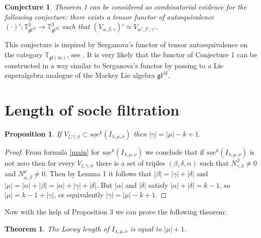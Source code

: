 \documentclass[letterpaper,11pt]{article}
\newtheorem{theorem}{Theorem}
\newtheorem{conjecture}{Conjecture}
\newtheorem{proposition}{Proposition}
\begin{document}
	\begin{conjecture}
		Theorem 1 can be considered as combinatorial evidence for the following conjecture: there exists a tensor functor of autoequivalence $(\cdot)':\mathbb{T}^3_{\mathfrak{gl}^M} \rightarrow \mathbb{T}^3_{\mathfrak{gl}^M}$ such that $(V_{\alpha, \beta, \gamma})' \simeq V_{\alpha', \beta', \gamma'}$.
	\end{conjecture}
	This conjecture is inspired by Serganova's functor of tensor autoequivalence on the category $\mathbb{T}_{\mathfrak{gl}( \infty )}$, see \cite{serganova}. It is very likely that the functor of Conjecture 1 can be constructed in a way similar to Serganova's functor by passing to a Lie superalgebra analogue of the Mackey Lie algebra $\mathfrak{gl}^M$.
	
	\section{Length of socle filtration}\label{sec-bound}
		
	\begin{proposition}
		If $V_{\zeta, \gamma, \phi} \subset \underline{soc}^k(I_{\lambda, \mu, \nu})$ then $|\gamma| = |\mu| - k + 1$.
	\end{proposition}
	\begin{proof}
		From formula \eqref{main} for $\underline{soc}^k(I_{\lambda, \mu, \nu})$ we conclude that if $\underline{soc}^k(I_{\lambda, \mu, \nu})$ is not zero then for every $V_{\zeta, \gamma, \phi}$ there is a set of triples $(\beta, \delta, \alpha)$ such that $N_{\gamma, \delta}^{\beta} \not = 0$ and  $N_{\alpha, \beta}^\mu \not = 0$. Then by Lemma 1 it follows that $|\beta| = |\gamma| + |\delta|$ and $|\mu| = |\alpha| + |\beta| = |\alpha| + |\gamma| + |\delta|$. But $|\alpha|$ and $|\delta|$ satisfy $|\alpha| + |\delta| = k-1$, so $|\mu| = k-1 + |\gamma|$, or equivalently $|\gamma| = |\mu| - k + 1$.
	\end{proof}
		
	Now with the help of Proposition 3 we can prove the following theorem:
		
	\begin{theorem}
			The Loewy length of $I_{\lambda, \mu, \nu}$ is equal to $|\mu| + 1$.
	\end{theorem}
	
\end{document}
